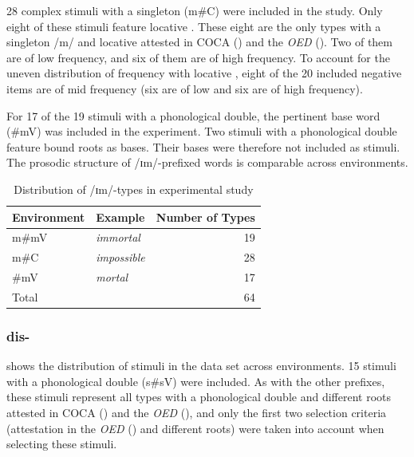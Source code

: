 28 complex stimuli with a singleton ({m\#C}) were included in the study. Only eight of these stimuli feature locative . These eight are the only types with a singleton /m/ and locative  attested in COCA (\citealt{Davies.20082014}) and the \textit{OED} (\citealt{OED.2013}). Two of them are of low frequency, and six of them are of high frequency.
 To account for the uneven distribution of frequency with locative , eight of the 20 included negative items are of mid frequency (six are of low and six are of high frequency).


For 17 of the 19 stimuli with a phonological double, the pertinent base word ({\#mV}) was included in the experiment. Two stimuli with a phonological double feature bound roots as bases. Their bases were therefore not included as stimuli. The prosodic structure of /ɪm/-prefixed words is comparable across environments.



\begin{table}

	\caption{Distribution of /ɪm/-types in experimental study}
	\label{tbl:distribution of im types in experiment}

	
		\begin{tabular} {llr}


Environment &Example &Number of   Types\\

 \midrule
 m\#mV&\color[HTML]{3166FF}\textit{immortal} & 19  \\
  m\#C&\color[HTML]{3166FF}\textit{impossible} & 28 \\
  \#mV&\color[HTML]{3166FF}\textit{mortal} & 17 \\
 \midrule
 Total& & 64\\
 \midrule

		\end{tabular}
	
\end{table}



\subsubsection{dis-} \label{dis stimui}

 shows the distribution of  stimuli in the data set across environments. 
15  stimuli with a phonological double (s\#sV) were included. As with the other prefixes, these stimuli represent all types with a phonological double and different roots attested in COCA (\citealt{Davies.20082014}) and the \textit{OED} (\citealt{OED.2013}),  and only the first two selection criteria (attestation in the \textit{OED} (\citealt{OED.2013}) and different roots) were taken into account when selecting these stimuli. 

